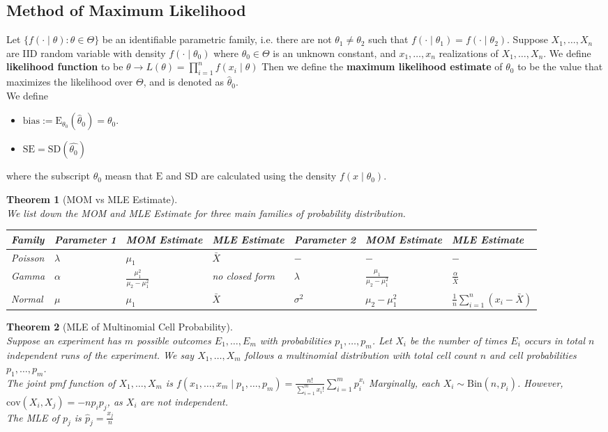 \documentclass[12pt]{article}
\newcommand{\expec}{\mathrm{E}}
\newcommand{\bin}{\mathrm{Bin}}
\newcommand{\cov}{\mathrm{cov}}
\newtheorem{theorem}{Theorem}[section]
\theoremstyle{definition}
\begin{document}
\subsection{Method of Maximum Likelihood}
Let $\{f(\cdot\mid \theta): \theta\in\Theta\}$ be an identifiable parametric family, i.e. there are not $\theta_1\neq \theta_2$ such that $f(\cdot\mid \theta_1)=f(\cdot\mid \theta_2)$. Suppose $X_1,\ldots, X_n$ are IID random variable with density $f(\cdot\mid \theta_0)$ where $\theta_0\in\Theta$ is an unknown constant, and $x_1,\ldots, x_n$ realizations of $X_1,\ldots, X_n$. We define \textbf{likelihood function} to be
$
\theta\to L(\theta)=\prod_{i=1}^n f(x_i\mid \theta)
$
Then we define the \textbf{maximum likelihood estimate} of $\theta_0$ to be the value that maximizes the likelihood over $\Theta$, and is denoted as $\hat{\theta}_0$.\\
We define 
\begin{itemize}
  \item $\text{bias}:=\expec_{\theta_0}(\hat{\theta}_0)=\theta_0$.
  \item $\text{SE}=\text{SD}(\hat{\theta_0})$
\end{itemize}
where the subscript $\theta_0$ measn that $\expec$ and $\text{SD}$ are calculated using the density $f(x\mid \theta_0)$.
\begin{theorem}[MOM vs MLE Estimate]
\hfill\\\normalfont We list down the MOM and MLE Estimate for three main families of probability distribution.\\
\begin{table}[h]
\centering
\begin{tabular}{|l|l|l|l|l|l|l|}
\hline
Family&Parameter 1& MOM Estimate&MLE Estimate &Parameter 2&MOM Estimate&MLE Estimate\\\hline
Poisson&$\lambda$ & $\mu_1$&$\bar{X}$ & $-$ & $-$ & $-$\\\hline
Gamma & $\alpha$ & $\frac{\mu_1^2}{\mu_2-\mu_1^2}$ & no closed form & $\lambda$ &$\frac{\mu_1}{\mu_2-\mu_1^2}$ &$\frac{\alpha}{\bar{X}}$\\\hline
Normal & $\mu$ & $\mu_1$ & $\bar{X}$ & $\sigma^2$ & $\mu_2-\mu_1^2$ & $\frac{1}{n}\sum_{i=1}^n(x_i-\bar{X})$\\\hline
\end{tabular}
\end{table}
\end{theorem}
\begin{theorem}[MLE of Multinomial Cell Probability]
\hfill\\\normalfont Suppose an experiment has $m$ possible outcomes $E_1,\ldots, E_m$ with probabilities $p_1,\ldots, p_m$. Let $X_i$ be the number of times $E_i$ occurs in total $n$ independent runs of the experiment.
We say $X_1,\ldots, X_m$ follows a multinomial distribution with total cell count $n$ and cell probabilities $p_1,\ldots, p_m$.\\
The joint pmf function of $X_1,\ldots, X_m$ is
$
f(x_1,\ldots, x_m\mid p_1,\ldots, p_m) = \frac{n!}{\sum_{i=1}^m x_i!}\sum_{i=1}^m p_i^{x_i}
$
Marginally, each $X_i\sim \bin(n,p_i)$. However, $\cov(X_i,X_j)=-np_ip_j$, as $X_i$ are not independent.\\
The MLE of $p_j$ is
$
\hat{p}_j=\frac{x_j}{n}
$
\end{theorem}
\end{document}
